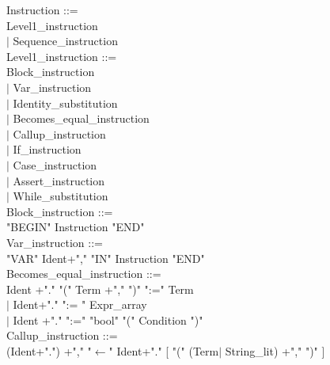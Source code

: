 \documentclass[12pt,a4paper,draft]{report}
\begin{document}
{\begin{sloppypar}
 
\noindent Instruction ::= \\
   Level1\_instruction\\
\hspace*{0.20in} $|$  Sequence\_instruction\\
Level1\_instruction ::= \\
   Block\_instruction\\
\hspace*{0.20in} $|$  Var\_instruction\\
\hspace*{0.20in} $|$  Identity\_substitution\\
\hspace*{0.20in} $|$  Becomes\_equal\_instruction\\
\hspace*{0.20in} $|$  Callup\_instruction\\
\hspace*{0.20in} $|$  If\_instruction\\
\hspace*{0.20in} $|$ Case\_instruction\\ 
\hspace*{0.20in} $|$  Assert\_instruction\\
\hspace*{0.20in} $|$  While\_substitution\\
Block\_instruction ::= \\
  "BEGIN"  Instruction  "END" \\
Var\_instruction ::= \\
   "VAR"  Ident+","  "IN"  Instruction  "END" \\
Becomes\_equal\_instruction ::= \\
\hspace*{0.20in}  Ident +"."  "(" Term +","  ")"  ":="  Term  \\   %
\hspace*{0.20in} $|$ Ident+"."  ":= " Expr\_array  \\
\hspace*{0.20in} $|$ Ident +"."   ":="  "bool" "(" Condition ")" \\
Callup\_instruction ::= \\
\hspace*{0.20in}  (Ident+".") +","  "$\leftarrow$"  Ident+"."  [ "(" (Term$|$ String\_lit) +","  ")" ] \\ %

\end{sloppypar}}
\end{document}
